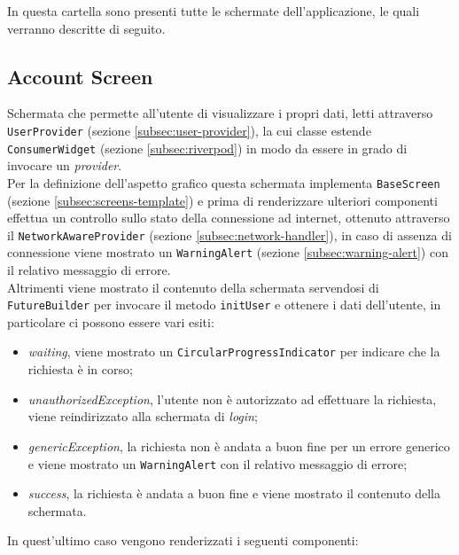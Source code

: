 In questa cartella sono presenti tutte le schermate dell'applicazione, le quali verranno descritte di seguito.

\subsection{Account Screen}
\label{subsec:account-screen}

Schermata che permette all'utente di visualizzare i propri dati, letti attraverso \lstinline{UserProvider} (sezione \ref{subsec:user-provider}), la cui classe estende \lstinline{ConsumerWidget} (sezione \ref{subsec:riverpod}) in modo da essere in grado di invocare un \emph{provider}. \\
Per la definizione dell'aspetto grafico questa schermata implementa \lstinline{BaseScreen} (sezione \ref{subsec:screens-template}) e prima di renderizzare ulteriori componenti effettua un controllo sullo stato della connessione ad internet, ottenuto attraverso il \lstinline{NetworkAwareProvider} (sezione \ref{subsec:network-handler}), in caso di assenza di connessione viene mostrato un \lstinline{WarningAlert} (sezione \ref{subsec:warning-alert}) con il relativo messaggio di errore. \\
Altrimenti viene mostrato il contenuto della schermata servendosi di \lstinline{FutureBuilder}\cite{site:future-builder} per invocare il metodo \lstinline{initUser} e ottenere i dati dell'utente, in particolare ci possono essere vari esiti:
\begin{itemize}
    \item \emph{waiting}, viene mostrato un \lstinline{CircularProgressIndicator}\cite{site:circular-progress-indicator} per indicare che la richiesta è in corso;
    \item \emph{unauthorizedException}, l'utente non è autorizzato ad effettuare la richiesta, viene reindirizzato alla schermata di \emph{login};
    \item \emph{genericException}, la richiesta non è andata a buon fine per un errore generico e viene mostrato un \lstinline{WarningAlert} con il relativo messaggio di errore;
    \item \emph{success}, la richiesta è andata a buon fine e viene mostrato il contenuto della schermata.
\end{itemize}
In quest'ultimo caso vengono renderizzati i seguenti componenti:
